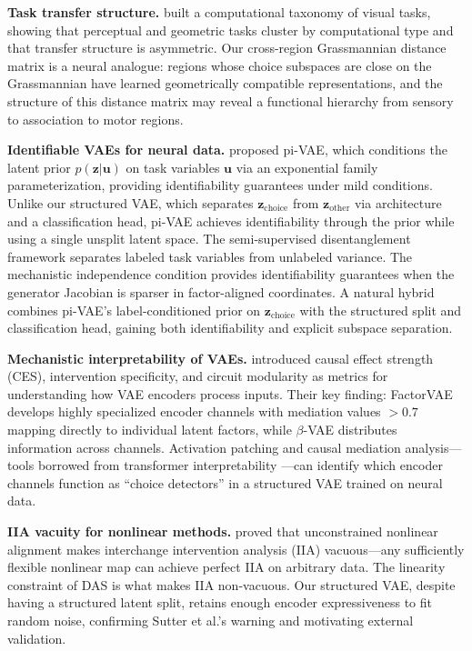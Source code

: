 \documentclass{article}
\begin{document}
\textbf{Task transfer structure.} \citet{zamir2018taskonomy} built a computational taxonomy of visual tasks, showing that perceptual and geometric tasks cluster by computational type and that transfer structure is asymmetric. Our cross-region Grassmannian distance matrix is a neural analogue: regions whose choice subspaces are close on the Grassmannian have learned geometrically compatible representations, and the structure of this distance matrix may reveal a functional hierarchy from sensory to association to motor regions.

\textbf{Identifiable VAEs for neural data.} \citet{zhou2020pivae} proposed pi-VAE, which conditions the latent prior $p(\mathbf{z}|\mathbf{u})$ on task variables $\mathbf{u}$ via an exponential family parameterization, providing identifiability guarantees under mild conditions. Unlike our structured VAE, which separates $\mathbf{z}_{\text{choice}}$ from $\mathbf{z}_{\text{other}}$ via architecture and a classification head, pi-VAE achieves identifiability through the prior while using a single unsplit latent space. The semi-supervised disentanglement framework \citep{narayanaswamy2017learning} separates labeled task variables from unlabeled variance. The mechanistic independence condition \citep{khemakhem2020variational} provides identifiability guarantees when the generator Jacobian is sparser in factor-aligned coordinates. A natural hybrid combines pi-VAE's label-conditioned prior on $\mathbf{z}_{\text{choice}}$ with the structured split and classification head, gaining both identifiability and explicit subspace separation.

\textbf{Mechanistic interpretability of VAEs.} \citet{martinez2025vae_circuits} introduced causal effect strength (CES), intervention specificity, and circuit modularity as metrics for understanding how VAE encoders process inputs. Their key finding: FactorVAE develops highly specialized encoder channels with mediation values $> 0.7$ mapping directly to individual latent factors, while $\beta$-VAE distributes information across channels. Activation patching and causal mediation analysis---tools borrowed from transformer interpretability \citep{geiger2024causal}---can identify which encoder channels function as ``choice detectors'' in a structured VAE trained on neural data.

\textbf{IIA vacuity for nonlinear methods.} \citet{sutter2025iia} proved that unconstrained nonlinear alignment makes interchange intervention analysis (IIA) vacuous---any sufficiently flexible nonlinear map can achieve perfect IIA on arbitrary data. The linearity constraint of DAS \citep{geiger2024causal} is what makes IIA non-vacuous. Our structured VAE, despite having a structured latent split, retains enough encoder expressiveness to fit random noise, confirming Sutter et al.'s warning and motivating external validation.
\end{document}
